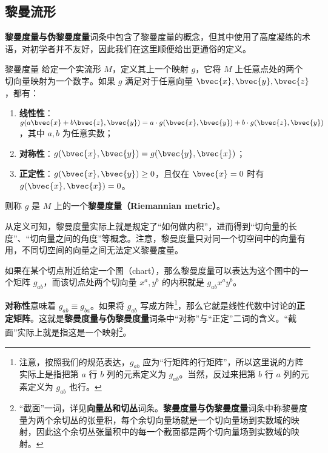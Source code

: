 



\subsection{黎曼流形}\label{RieCon_sub1}

\textbf{黎曼度量与伪黎曼度量}词条中包含了黎曼度量的概念，但其中使用了高度凝练的术语，对初学者并不友好，因此我们在这里顺便给出更通俗的定义。

\begin{definition}{黎曼度量}
给定一个实流形 $M$，定义其上一个映射 $g$，它将 $M$ 上任意点处的两个切向量映射为一个数字。如果 $g$ 满足对于任意向量 $\bvec{x}, \bvec{y}, \bvec{z}$，都有：
\begin{enumerate}
\item \textbf{线性性}：$g(a\bvec{x}+b\bvec{z}, \bvec{y})=a\cdot g(\bvec{x}, \bvec{y})+b\cdot g(\bvec{z}, \bvec{y})$，其中 $a, b$ 为任意实数；
\item \textbf{对称性}：$g(\bvec{x}, \bvec{y})=g(\bvec{y}, \bvec{x})$；
\item \textbf{正定性}：$g(\bvec{x}, \bvec{y})\geq 0$，且仅在 $\bvec{x}=0$ 时有 $g(\bvec{x}, \bvec{x})=0$。
\end{enumerate}
则称 $g$ 是 $M$ 上的一个\textbf{黎曼度量（Riemannian metric）}。
\end{definition}

从定义可知，黎曼度量实际上就是规定了“如何做内积”，进而得到“切向量的长度”、“切向量之间的角度”等概念。注意，黎曼度量只对同一个切空间中的向量有用，不同切空间的向量之间无法定义黎曼度量。

如果在某个切点附近给定一个图（chart），那么黎曼度量可以表达为这个图中的一个矩阵 $g_{ab}$，而该切点处两个切向量 ${x}^a, {y}^b$ 的内积就是 $g_{ab}{x}^a{y}^b$。

\textbf{对称性}意味着 $g_{ab}\equiv g_{ba}$。如果将 $g_{ab}$ 写成方阵\footnote{注意，按照我们的规范表达，$g_{ab}$ 应为“行矩阵的行矩阵”，所以这里说的方阵实际上是指把第 $a$ 行 $b$ 列的元素定义为 $g_{ab}$。当然，反过来把第 $b$ 行 $a$ 列的元素定义为 $g_{ab}$ 也行。}，那么它就是线性代数中讨论的\textbf{正定矩阵}。这就是\textbf{黎曼度量与伪黎曼度量}词条中“对称”与“正定”二词的含义。“截面”实际上就是指这是一个映射\footnote{“截面”一词，详见\textbf{向量丛和切丛}词条。\textbf{黎曼度量与伪黎曼度量}词条中称黎曼度量为两个余切丛的张量积，每个余切向量场就是一个切向量场到实数域的映射，因此这个余切丛张量积中的每一个截面都是两个切向量场到实数域的映射。}。


